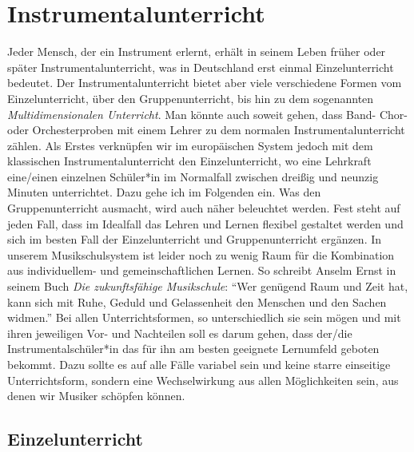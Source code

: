 \section{Instrumentalunterricht}

Jeder Mensch, der ein Instrument erlernt, erhält in seinem Leben früher oder
später Instrumentalunterricht, was in Deutschland erst einmal Einzelunterricht
bedeutet. Der Instrumentalunterricht bietet aber viele verschiedene Formen vom
Einzelunterricht, über den Gruppenunterricht, bis hin zu dem sogenannten
\emph{Multidimensionalen Unterricht}. Man könnte auch soweit gehen, dass Band-
Chor- oder Orchesterproben mit einem Lehrer zu dem normalen
Instrumentalunterricht zählen. Als Erstes verknüpfen wir im europäischen System
jedoch mit dem klassischen Instrumentalunterricht den Einzelunterricht, wo eine
Lehrkraft eine/einen einzelnen Schüler*in im Normalfall zwischen dreißig und
neunzig Minuten unterrichtet. Dazu gehe ich im Folgenden ein. Was den
Gruppenunterricht ausmacht, wird auch näher beleuchtet werden. Fest steht auf
jeden Fall, dass im Idealfall das Lehren und Lernen flexibel gestaltet werden
und sich im besten Fall der Einzelunterricht und Gruppenunterricht ergänzen. In
unserem Musikschulsystem ist leider noch zu wenig Raum für die Kombination aus
individuellem- und gemeinschaftlichen Lernen. So schreibt Anselm Ernst in seinem
Buch \emph{Die zukunftsfähige Musikschule}: \enquote{Wer genügend Raum und Zeit hat,
kann sich mit Ruhe, Geduld und Gelassenheit den Menschen und den Sachen widmen.}
\autocite[84]{ernst:die_zukunftsfaehige_musikschule} Bei allen
Unterrichtsformen, so unterschiedlich sie sein mögen und mit ihren jeweiligen
Vor- und Nachteilen soll es darum gehen, dass der/die Instrumentalschüler*in das
für ihn am besten geeignete Lernumfeld geboten bekommt. Dazu sollte es auf alle
Fälle variabel sein und keine starre einseitige Unterrichtsform, sondern eine
Wechselwirkung aus allen Möglichkeiten sein, aus denen wir Musiker schöpfen
können. 



\subsection{Einzelunterricht}

